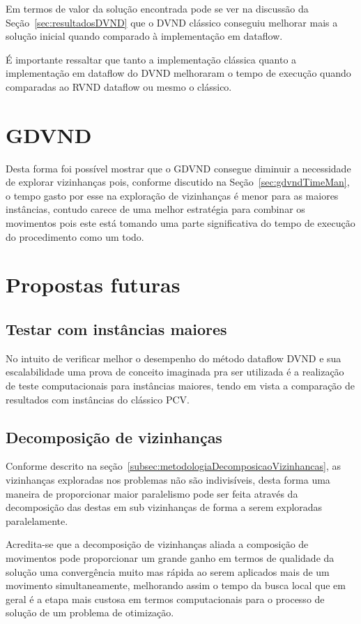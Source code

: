 Em termos de valor da solução encontrada pode se ver na discussão da Seção~\ref{sec:resultadosDVND} que o DVND clássico conseguiu melhorar mais a solução inicial quando comparado à implementação em dataflow.

É importante ressaltar que tanto a implementação clássica quanto a implementação em dataflow do DVND melhoraram o tempo de execução quando comparadas ao RVND dataflow ou mesmo o clássico.

\section{GDVND}

Desta forma foi possível mostrar que o GDVND consegue diminuir a necessidade de explorar vizinhanças pois, conforme discutido na Seção~\ref{sec:gdvndTimeMan}, o tempo gasto por esse na exploração de vizinhanças é menor para as maiores instâncias, contudo carece de uma melhor estratégia para combinar os movimentos pois este está tomando uma parte significativa do tempo de execução do procedimento como um todo.

% 

\section{Propostas futuras}

\subsection{Testar com instâncias maiores} \label{subsec:instanciasMaiores}

No intuito de verificar melhor o desempenho do método dataflow DVND e sua escalabilidade uma prova de conceito imaginada pra ser utilizada é a realização de teste computacionais para instâncias maiores, tendo em vista a comparação de resultados com instâncias do clássico PCV.

\subsection{Decomposição de vizinhanças} \label{subsec:decomposicaoVizinhancas}

Conforme descrito na seção~\ref{subsec:metodologiaDecomposicaoVizinhancas}, as vizinhanças exploradas nos problemas não são indivisíveis, desta forma uma maneira de proporcionar maior paralelismo pode ser feita através da decomposição das destas em sub vizinhanças de forma a serem exploradas paralelamente.

Acredita-se que a decomposição de vizinhanças aliada a composição de movimentos pode proporcionar um grande ganho em termos de qualidade da solução uma convergência muito mas rápida ao serem aplicados mais de um movimento simultaneamente, melhorando assim o tempo da busca local que em geral é a etapa mais custosa em termos computacionais para o processo de solução de um problema de otimização.

% 